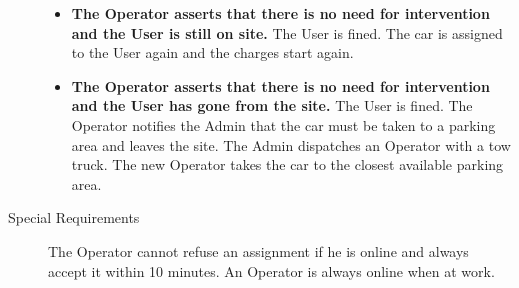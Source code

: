 \begin{description}
\begin{itemize}
				\item \textbf{The Operator asserts that there is no need for intervention and the User is still on site.} The User is fined. The car is assigned to the User again and the charges start again.
				\item \textbf{The Operator asserts that there is no need for intervention and the User has gone from the site.} The User is fined. The Operator notifies the Admin that the car must be taken to a parking area and leaves the site. The Admin dispatches an Operator with a tow truck. The new Operator takes the car to the closest available parking area.
			\end{itemize}
			\item[Special Requirements] The Operator cannot refuse an assignment if he is online and always accept it within 10 minutes. An Operator is always online when at work.
		\end{description}

